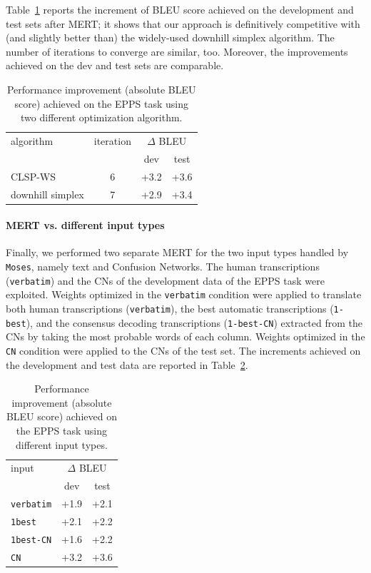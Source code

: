 \documentclass[10pt]{report}
\theoremstyle{plain}
\begin{document}
{Table~\ref{tbl:MERT-epps-algorithm} reports the increment of BLEU score achieved on the development and test sets after MERT; it shows that our approach is definitively competitive with (and slightly better than) the widely-used downhill simplex algorithm. The number of iterations to converge are similar, too.
Moreover, the improvements achieved on the dev and test sets are comparable.


 \begin{table}[ht]
\begin{center}
\label{tbl:MERT-epps-algorithm}
\begin{tabular}{l|ccc}
algorithm               & iteration & \multicolumn{2}{c}{$\Delta$ BLEU}\\
                                &                & dev & test\\
\hline
CLSP-WS              & 6 & +3.2 & +3.6 \\
downhill simplex  & 7 & +2.9  & +3.4\\
\end{tabular}
\caption{Performance improvement (absolute BLEU score) achieved on the EPPS task using two different optimization algorithm.}
\end{center}
\end{table}

\paragraph{MERT vs. different input types} Finally, we performed two separate MERT for the two input types handled by {\tt Moses}, namely text and Confusion Networks. The human transcriptions ({\tt verbatim}) and the CNs of the development data of the EPPS task were exploited. Weights optimized in the {\tt verbatim} condition were applied to translate both human transcriptions ({\tt verbatim}), the best automatic transcriptions ({\tt 1-best}),  and the consensus decoding transcriptions ({\tt 1-best-CN}) extracted from the CNs \cite{mangu:00} by taking the most probable words of  each column. Weights optimized in the {\tt CN} condition were applied to the CNs of the test set.
The increments achieved on the development and test data are reported in Table~\ref{tbl:MERT-epps-summary}.


 \begin{table}[ht]
\begin{center}
\label{tbl:MERT-epps-summary}
\begin{tabular}{l|cc}
input                    &\multicolumn{2}{c}{$\Delta$ BLEU}\\
                             & dev & test\\
\hline
{\tt verbatim}  &  +1.9 & +2.1\\
{\tt 1best}        &  +2.1 & +2.2\\
{\tt 1best-CN} &  +1.6 & +2.2\\
\hline
{\tt CN}            &  +3.2 & +3.6\\
\end{tabular}
\caption{Performance improvement  (absolute BLEU score) achieved on the EPPS task using different input types.}
\end{center}
\end{table}

}
\end{document}
